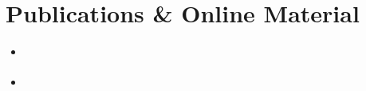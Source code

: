 \documentclass[12pt]{article}
\renewcommand\cite{\citep}  %
\newcommand{\CJ}{\pazocal{J}}
\begin{document}
	


\cleardoublepage
\section*{Publications \& Online Material}
\begin{itemize}
	\item \cite{vouros2019empirical}
	\item \cite{vouros2020semi}
\end{itemize}	
	
\end{document}

